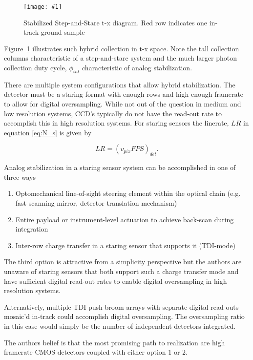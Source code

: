 \documentclass[]{spieman}  %
\newcommand{\includefigure}[3]
{
  \begin{figure}[h!tb]
  \centering
  \texttt{[image: \#1]}
  \caption[]{#3}
  \label{#2}
  \end{figure}
}
\begin{document}
\includefigure{figures/stab_step_stare.pgf}{fig:stab_step_stare}{Stabilized Step-and-Stare t-x diagram.  Red row indicates one in-track ground sample}

Figure~\ref{fig:stab_step_stare} illustrates such hybrid collection in t-x space.  Note the tall collection columns characteristic of a step-and-stare system and the much larger photon collection duty cycle, $\phi_{int}$ characteristic of analog stabilization.  

There are multiple system configurations that allow hybrid stabilization.  The detector must be a staring format with enough rows and high enough framerate to allow for digital oversampling.  While not out of the question in medium and low resolution systems, CCD's typically do not have the read-out rate to accomplish this in high resolution systems.  For staring sensors the linerate, $LR$ in equation \eqref{eq:N_s} is given by

\begin{equation}
\label{eq:lr_framing}    
LR = \left(v_{pix}FPS\right)_{det}.
\end{equation}

Analog stabilization in a staring sensor system can be accomplished in one of three ways

\begin{enumerate}
    \item Optomechanical line-of-sight steering element within the optical chain (e.g. fast scanning mirror, detector translation mechanism) \cite{patent:dirk}
    \item Entire payload or instrument-level actuation to achieve back-scan during integration \cite{patent:jonny}
    \item Inter-row charge transfer in a staring sensor that supports it (TDI-mode)
\end{enumerate}

The third option is attractive from a simplicity perspective but the authors are unaware of staring sensors that both support such a charge transfer mode and have sufficient digital read-out rates to enable digital oversampling in high resolution systems.

Alternatively, multiple TDI push-broom arrays with separate digital read-outs mosaic'd in-track could accomplish digital oversampling.  The oversampling ratio in this case would simply be the number of independent detectors integrated.

The authors belief is that the most promising path to realization are high framerate CMOS detectors coupled with either option 1 or 2.
\end{document}
